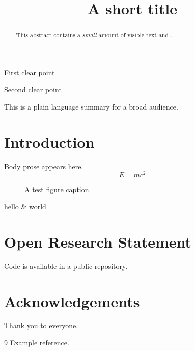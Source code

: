 \documentclass{article}
\begin{document}
\title{A short title}
\begin{keypoints}
\item First clear point
\item Second clear point
\end{keypoints}
\begin{abstract}
This abstract contains a \textit{small} amount of visible text and \citep{Example2020}.
\end{abstract}
\begin{plainlanguagesummary}
This is a plain language summary for a broad audience.
\end{plainlanguagesummary}
\section{Introduction}
Body prose appears here. 
\begin{equation} E=mc^2 \end{equation}
\begin{figure}
\caption{A test figure caption.}
\end{figure}
\begin{table}
\caption{A test table caption.}
hello & world \\
\end{table}
\section*{Open Research Statement}
Code is available in a public repository.
\section*{Acknowledgements}
Thank you to everyone.
\begin{thebibliography}{9}
 Example reference.
\end{thebibliography}
\end{document}
